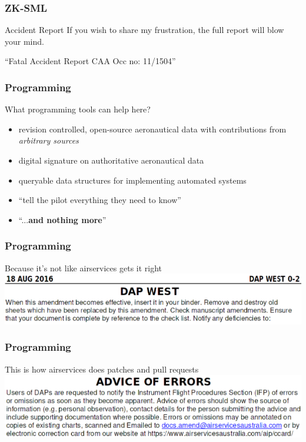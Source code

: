 \begin{frame}
\frametitle{ZK-SML}
\begin{block}{Accident Report}
If you wish to share my frustration, the full report will blow your mind.
\end{block}
``Fatal Accident Report CAA Occ no: 11/1504''
\end{frame}

\begin{frame}
\frametitle{Programming}
\begin{block}{What programming tools can help here?}
\begin{itemize}
\item<1-> revision controlled, open-source aeronautical data with contributions from \emph{arbitrary sources}
\item<2-> digital signature on authoritative aeronautical data
\item<3-> queryable data structures for implementing automated systems
\item<4-> ``tell the pilot everything they need to know''
\item<4-> ``...\textbf{and nothing more}''
\end{itemize}
\end{block}
\end{frame}

\begin{frame}
\frametitle{Programming}
\begin{block}{Because it's not like airservices gets it right}
\includegraphics[height=0.18\textheight]{image/dap-amendment.png}
\end{block}
\end{frame}

\begin{frame}
\frametitle{Programming}
\begin{block}{This is how airservices does patches and pull requests}
\includegraphics[height=0.2\textheight]{image/dap-errors.png}
\end{block}
\end{frame}


